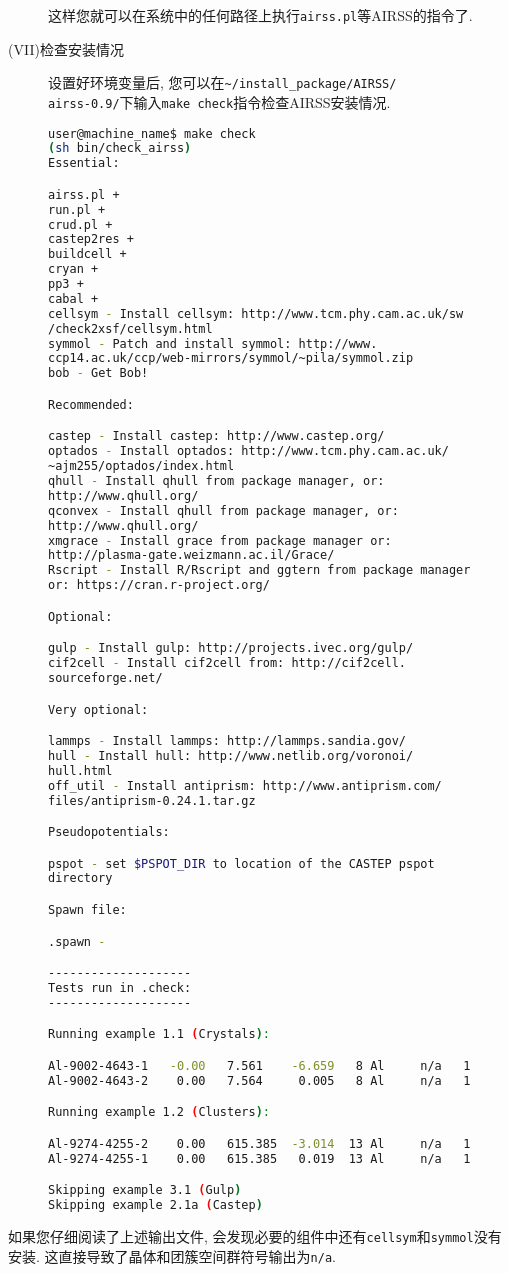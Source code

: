 \documentclass[a4paper, 10pt]{article}
\begin{document}
\begin{description}
这样您就可以在系统中的任何路径上执行\verb|airss.pl|等AIRSS的指令了.

\item[(VII)检查安装情况] 设置好环境变量后, 您可以在\verb|~/install_package/AIRSS/|
\\\verb|airss-0.9/|下输入\verb|make check|指令检查AIRSS安装情况. 
\begin{lstlisting}[language={bash}]
user@machine_name$ make check
(sh bin/check_airss)
Essential:

airss.pl +
run.pl +
crud.pl +
castep2res +
buildcell +
cryan +
pp3 +
cabal +
cellsym - Install cellsym: http://www.tcm.phy.cam.ac.uk/sw
/check2xsf/cellsym.html
symmol - Patch and install symmol: http://www.
ccp14.ac.uk/ccp/web-mirrors/symmol/~pila/symmol.zip
bob - Get Bob!

Recommended:

castep - Install castep: http://www.castep.org/
optados - Install optados: http://www.tcm.phy.cam.ac.uk/
~ajm255/optados/index.html
qhull - Install qhull from package manager, or: 
http://www.qhull.org/
qconvex - Install qhull from package manager, or: 
http://www.qhull.org/
xmgrace - Install grace from package manager or: 
http://plasma-gate.weizmann.ac.il/Grace/
Rscript - Install R/Rscript and ggtern from package manager
or: https://cran.r-project.org/

Optional:

gulp - Install gulp: http://projects.ivec.org/gulp/
cif2cell - Install cif2cell from: http://cif2cell.
sourceforge.net/

Very optional:

lammps - Install lammps: http://lammps.sandia.gov/
hull - Install hull: http://www.netlib.org/voronoi/
hull.html
off_util - Install antiprism: http://www.antiprism.com/
files/antiprism-0.24.1.tar.gz

Pseudopotentials:

pspot - set $PSPOT_DIR to location of the CASTEP pspot 
directory

Spawn file:

.spawn - 

--------------------
Tests run in .check:
--------------------

Running example 1.1 (Crystals):

Al-9002-4643-1   -0.00   7.561    -6.659   8 Al     n/a   1
Al-9002-4643-2    0.00   7.564     0.005   8 Al     n/a   1

Running example 1.2 (Clusters):

Al-9274-4255-2    0.00   615.385  -3.014  13 Al     n/a   1
Al-9274-4255-1    0.00   615.385   0.019  13 Al     n/a   1

Skipping example 3.1 (Gulp)
Skipping example 2.1a (Castep)
\end{lstlisting}       
\end{description}
如果您仔细阅读了上述输出文件, 会发现必要的组件中还有\verb|cellsym|和\verb|symmol|没有安装. 这直接导致了晶体和团簇空间群符号输出为\verb|n/a|. 
\end{document}
